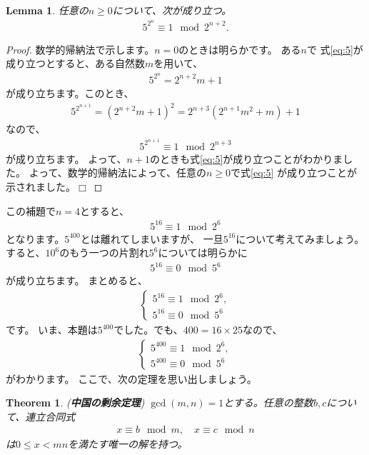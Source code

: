 \documentclass{jsarticle}
\newtheorem{theorem}{Theorem}
\newtheorem{proof}{Proof}
\newtheorem{lem}{Lemma}
\def\qed{\hfill $\Box$}
\begin{document}
\begin{shaded}
\begin{lem}
任意の$n\geq 0$について、次が成り立つ。
\begin{align}
5^{2^{n}}\equiv 1 \mod 2^{n+2}.
\label{eq:5}
\end{align}
\end{lem}
\end{shaded}
\begin{proof}
数学的帰納法で示します。$n=0$のときは明らかです。
ある$n$で	式\eqref{eq:5}が成り立つとすると、ある自然数$m$を用いて、
\begin{align}
5^{2^{n}}=2^{n+2}m+1
\end{align}
が成り立ちます。このとき、
\begin{align}
5^{2^{n+1}}=(2^{n+2}m+1)^2=2^{n+3}(2^{n+1}m^{2}+m)+1
\end{align}
なので、
\begin{align}
5^{2^{n+1}}\equiv 1 \mod 2^{n+3}
\end{align}
が成り立ちます。
よって、$n+1$のときも式\eqref{eq:5}が成り立つことがわかりました。
よって、数学的帰納法によって、任意の$n\geq 0$で式\eqref{eq:5}
が成り立つことが示されました。\qed
\end{proof}
この補題で$n=4$とすると、
\begin{align}
5^{16}\equiv 1 \mod 2^{6}
\end{align}
となります。$5^{400}$とは離れてしまいますが、
一旦$5^{16}$について考えてみましょう。
すると、$10^{6}$のもう一つの片割れ$5^{6}$については明らかに
\begin{align}
5^{16}\equiv 0 \mod 5^{6}
\end{align}
が成り立ちます。
まとめると、
\begin{align}
\left\{
\begin{array}{l}
5^{16}\equiv 1 \mod 2^{6},\\
5^{16}\equiv 0 \mod 5^{6}
\end{array}
\right.
\label{eq:5^16}
\end{align}
です。
いま、本題は$5^{400}$でした。でも、$400=16\times25$なので、
\begin{align}
\left\{
\begin{array}{l}
5^{400}\equiv 1 \mod 2^{6},\\
5^{400}\equiv 0 \mod 5^{6}
\end{array}
\right.
\label{eq:5^400}
\end{align}
がわかります。
ここで、次の定理を思い出しましょう。
\begin{shaded}
\begin{theorem}{(\textbf{中国の剰余定理})}
$\gcd(m,n)=1$とする。任意の整数$b,c$について、連立合同式
\begin{align}
x\equiv b\mod m,\quad x\equiv c\mod n
\end{align}
は$0\leq x<mn$を満たす唯一の解を持つ。
\end{theorem}
\end{shaded}
\end{document}
